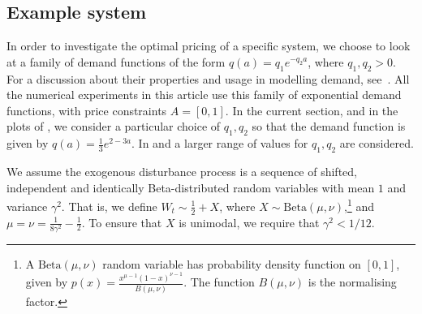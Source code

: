 \documentclass[main.tex]{subfiles}
\begin{document}
\subsection{Example system}\label{sec:bellman_example_markdown}
In order to investigate the optimal pricing of a specific system, we
choose to look at a family of demand functions of the form
$q(a)=q_1e^{-q_2a}$, where $q_1,q_2>0$. For a discussion
about their properties and usage in modelling demand, see~\cite[Ch.~7]{talluri2006theory}.
All the numerical experiments in this article use this family of exponential
demand functions, with price constraints $A=[0,1]$.
In the current section, and in the plots of ,
we consider a particular choice of $q_1,q_2$ so that the demand
function is given by $q(a)=\frac{1}{3}e^{2-3a}$.
In  and  a larger
range of values for $q_1,q_2$ are considered.

We assume the exogenous disturbance process is a sequence of
shifted, independent and identically Beta-distributed random
variables with mean $1$ and variance
$\gamma^2$. That is, we define $W_t\sim \frac{1}{2}+X$, where
$X\sim \mathrm{Beta}(\mu,\nu)$,\footnote{A
  $\mathrm{Beta}(\mu,\nu)$ random variable has probability density
  function on $[0,1]$, given by
  $p(x)=\frac{x^{\mu-1}{(1-x)}^{\nu-1}}{B(\mu,\nu)}$.
  The function $B(\mu,\nu)$ is the normalising factor.
}
and $\mu=\nu=\frac{1}{8\gamma^2}-\frac{1}{2}$.
To ensure that $X$ is unimodal, we require that $\gamma^2<1/12$.
\end{document}

